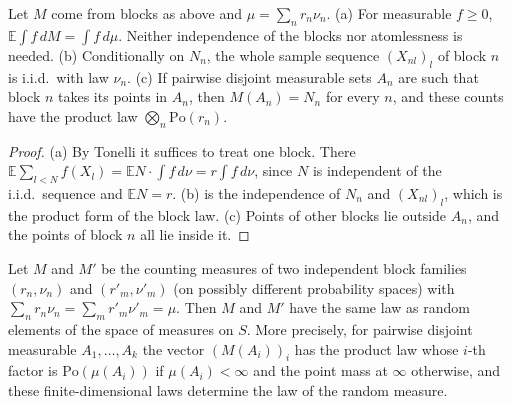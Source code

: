 \begin{lemma}\label{lem:sg:poisson-campbell}
  \leanok
Let $M$ come from blocks as above and $\mu=\sum_nr_n\nu_n$.
(a) For measurable $f\ge0$, $\mathbb E\int f\,dM=\int f\,d\mu$. Neither independence of the blocks nor atomlessness is needed.
(b) Conditionally on $N_n$, the whole sample sequence $(X_{nl})_l$ of block $n$ is i.i.d.\ with law $\nu_n$.
(c) If pairwise disjoint measurable sets $A_n$ are such that block $n$ takes its points in $A_n$, then $M(A_n)=N_n$ for every $n$, and these counts have the product law $\bigotimes_n\mathrm{Po}(r_n)$.
\end{lemma}

\begin{proof}
  \leanok
(a) By Tonelli it suffices to treat one block. There $\mathbb E\sum_{l<N}f(X_l)=\mathbb E N\cdot\int f\,d\nu=r\int f\,d\nu$, since $N$ is independent of the i.i.d.\ sequence and $\mathbb EN=r$. (b) is the independence of $N_n$ and $(X_{nl})_l$, which is the product form of the block law. (c) Points of other blocks lie outside $A_n$, and the points of block $n$ all lie inside it.
\end{proof}

\begin{theorem}\label{thm:sg:poisson-equivalence}
  \leanok
Let $M$ and $M'$ be the counting measures of two independent block families $(r_n,\nu_n)$ and $(r'_m,\nu'_m)$ (on possibly different probability spaces) with $\sum_nr_n\nu_n=\sum_mr'_m\nu'_m=\mu$. Then $M$ and $M'$ have the same law as random elements of the space of measures on $S$. More precisely, for pairwise disjoint measurable $A_1,\dots,A_k$ the vector $(M(A_i))_i$ has the product law whose $i$-th factor is $\mathrm{Po}(\mu(A_i))$ if $\mu(A_i)<\infty$ and the point mass at $\infty$ otherwise, and these finite-dimensional laws determine the law of the random measure.
\end{theorem}

